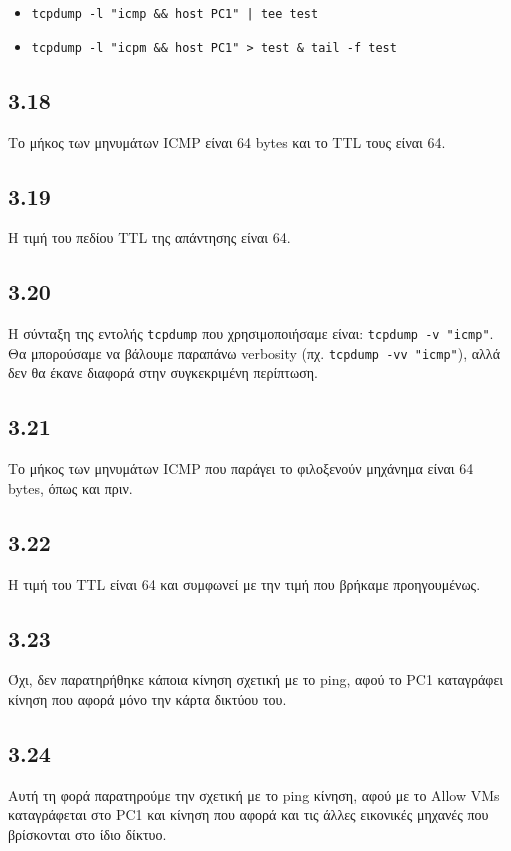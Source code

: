 \documentclass[a4paper, 12pt]{article}
\begin{document}
		\begin{itemize}
			\item \verb+tcpdump -l "icmp && host PC1" | tee test+
			\item \verb|tcpdump -l "icpm && host PC1" > test & tail -f test|
		\end{itemize}

	\subsection*{3.18}
		Το μήκος των μηνυμάτων ICMP είναι 64 bytes και το TTL τους είναι 64.

	\subsection*{3.19}
		Η τιμή του πεδίου TTL της απάντησης είναι 64. 

	\subsection*{3.20}
		Η σύνταξη της εντολής \verb|tcpdump| που χρησιμοποιήσαμε είναι: \verb|tcpdump -v "icmp"|. Θα μπορούσαμε να βάλουμε παραπάνω verbosity (πχ. \verb|tcpdump -vv "icmp"|), αλλά δεν θα έκανε διαφορά στην συγκεκριμένη περίπτωση.

	\subsection*{3.21}
		Το μήκος των μηνυμάτων ICMP που παράγει το φιλοξενούν μηχάνημα είναι 64 bytes, όπως και πριν. 

	\subsection*{3.22}
		Η τιμή του TTL είναι 64 και συμφωνεί με την τιμή που βρήκαμε προηγουμένως.

	\subsection*{3.23}
		Όχι, δεν παρατηρήθηκε κάποια κίνηση σχετική με το ping, αφού το PC1 καταγράφει κίνηση που αφορά μόνο την κάρτα δικτύου του.

	\subsection*{3.24}
		Αυτή τη φορά παρατηρούμε την σχετική με το ping κίνηση, αφού με το Allow VMs καταγράφεται στο PC1 και κίνηση που αφορά και τις άλλες εικονικές μηχανές που βρίσκονται στο ίδιο δίκτυο.
\end{document}
